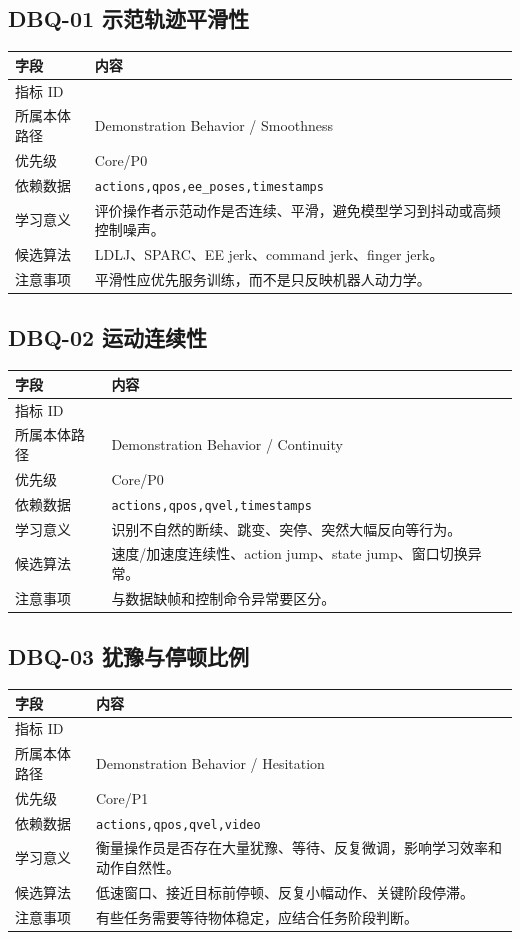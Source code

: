 \documentclass[UTF8,zihao=-4,oneside,openany]{ctexrep}
\newcommand{\Code}[1]{\texttt{#1}}
\newcommand{\MID}[1]{\texttt{\seqsplit{#1}}}
\begin{document}
\subsection{DBQ-01 示范轨迹平滑性}

\begin{longtable}{L{3.6cm} L{9.6cm}}
\toprule
字段 & 内容 \\
\midrule
指标 ID & \MID{DBQ-01} \\
所属本体路径 & Demonstration Behavior / Smoothness \\
优先级 & Core/P0 \\
依赖数据 & \Code{actions,qpos,ee\_poses,timestamps} \\
学习意义 & 评价操作者示范动作是否连续、平滑，避免模型学习到抖动或高频控制噪声。 \\
候选算法 & LDLJ、SPARC、EE jerk、command jerk、finger jerk。 \\
注意事项 & 平滑性应优先服务训练，而不是只反映机器人动力学。 \\
\bottomrule
\end{longtable}

\subsection{DBQ-02 运动连续性}

\begin{longtable}{L{3.6cm} L{9.6cm}}
\toprule
字段 & 内容 \\
\midrule
指标 ID & \MID{DBQ-02} \\
所属本体路径 & Demonstration Behavior / Continuity \\
优先级 & Core/P0 \\
依赖数据 & \Code{actions,qpos,qvel,timestamps} \\
学习意义 & 识别不自然的断续、跳变、突停、突然大幅反向等行为。 \\
候选算法 & 速度/加速度连续性、action jump、state jump、窗口切换异常。 \\
注意事项 & 与数据缺帧和控制命令异常要区分。 \\
\bottomrule
\end{longtable}

\subsection{DBQ-03 犹豫与停顿比例}

\begin{longtable}{L{3.6cm} L{9.6cm}}
\toprule
字段 & 内容 \\
\midrule
指标 ID & \MID{DBQ-03} \\
所属本体路径 & Demonstration Behavior / Hesitation \\
优先级 & Core/P1 \\
依赖数据 & \Code{actions,qpos,qvel,video} \\
学习意义 & 衡量操作员是否存在大量犹豫、等待、反复微调，影响学习效率和动作自然性。 \\
候选算法 & 低速窗口、接近目标前停顿、反复小幅动作、关键阶段停滞。 \\
注意事项 & 有些任务需要等待物体稳定，应结合任务阶段判断。 \\
\bottomrule
\end{longtable}
\end{document}
